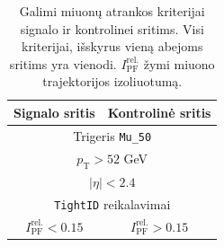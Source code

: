 \documentclass[a4paper, 12pt, oneside]{article}
\newcommand{\ttt}[1]{\texttt{#1}}
\newcommand{\pT}{p_{\mathrm{T}}}
\begin{document}
\begin{table}
	\begin{tabular}{|c|c|}
		\hline
		\textbf{Signalo sritis} & \textbf{Kontrolinė sritis} \\
		\hline\hline
		\multicolumn{2}{|c|}{Trigeris \ttt{Mu\_50}} \\
		\hline
		\multicolumn{2}{|c|}{$\pT>52$ GeV} \\
		\hline
		\multicolumn{2}{|c|}{$|\eta|<2.4$} \\
		\hline
		\multicolumn{2}{|c|}{\ttt{TightID} reikalavimai} \\
		\hline
		$I_{\mathrm{PF}}^{\mathrm{rel.}} < 0.15$ & $I_{\mathrm{PF}}^{\mathrm{rel.}} > 0.15$ \\
		\hline
	\end{tabular}
	\caption{\label{table:FR} Galimi miuonų atrankos kriterijai signalo ir kontrolinei sritims. Visi kriterijai, išskyrus vieną
	abejoms sritims yra vienodi.
	$I_{\mathrm{PF}}^{\mathrm{rel.}}$ žymi miuono trajektorijos izoliuotumą.}
\end{table}
\end{document}

